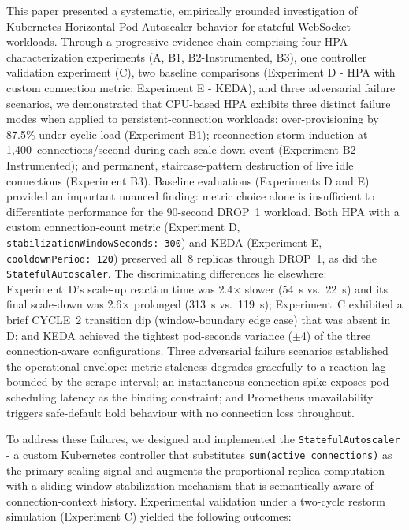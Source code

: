 \documentclass[twocolumn]{svjour3}
\begin{document}
This paper presented a systematic, empirically grounded investigation of Kubernetes Horizontal Pod Autoscaler behavior for stateful WebSocket workloads. Through a progressive evidence chain comprising four HPA characterization experiments (A, B1, B2-Instrumented, B3), one controller validation experiment (C), two baseline comparisons (Experiment D - HPA with custom connection metric; Experiment E - KEDA), and three adversarial failure scenarios, we demonstrated that CPU-based HPA exhibits three distinct failure modes when applied to persistent-connection workloads: over-provisioning by 87.5\% under cyclic load (Experiment B1); reconnection storm induction at 1,400~connections/second during each scale-down event (Experiment B2-Instrumented); and permanent, staircase-pattern destruction of live idle connections (Experiment B3). Baseline evaluations (Experiments D and E) provided an important nuanced finding: metric choice alone is insufficient to differentiate performance for the 90-second DROP~1 workload.  Both HPA with a custom connection-count metric (Experiment D, \texttt{stabilizationWindowSeconds:~300}) and KEDA (Experiment E, \texttt{cooldownPeriod:~120}) preserved all~8 replicas through DROP~1, as did the \texttt{StatefulAutoscaler}.  The discriminating differences lie elsewhere: Experiment~D's scale-up reaction time was 2.4$\times$ slower (54~s vs.~22~s) and its final scale-down was 2.6$\times$ prolonged (313~s vs.~119~s); Experiment~C exhibited a brief CYCLE~2 transition dip (window-boundary edge case) that was absent in D; and KEDA achieved the tightest pod-seconds variance ($\pm$4) of the three connection-aware configurations. Three adversarial failure scenarios established the operational envelope: metric staleness degrades gracefully to a reaction lag bounded by the scrape interval; an instantaneous connection spike exposes pod scheduling latency as the binding constraint; and Prometheus unavailability triggers safe-default hold behaviour with no connection loss throughout.

To address these failures, we designed and implemented the \texttt{StatefulAutoscaler} - a custom Kubernetes controller that substitutes \texttt{sum(active\_connections)} as the primary scaling signal and augments the proportional replica computation with a sliding-window stabilization mechanism that is semantically aware of connection-context history. Experimental validation under a two-cycle restorm simulation (Experiment C) yielded the following outcomes:
\end{document}
